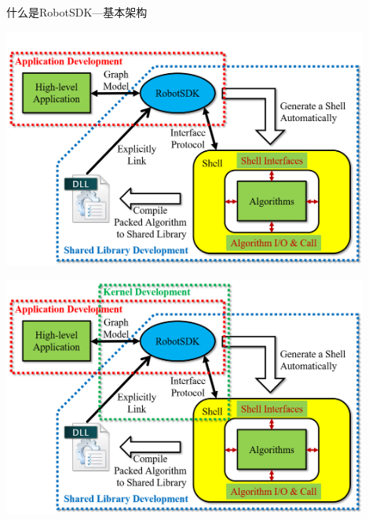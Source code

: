 \documentclass[9pt]{beamer}
\begin{document}
\begin{frame}[allowframebreaks]{什么是RobotSDK---基本架构}
\begin{center}
		\end{center}
		\begin{center}
			\includegraphics[width=0.9\textwidth]{./img/frame8}
		\end{center}
		\begin{center}
			\includegraphics[width=0.9\textwidth]{./img/frame9}
		\end{center}
	\end{frame}
	
\end{document}
